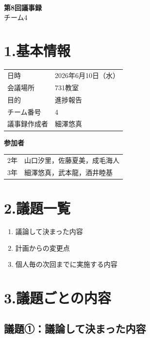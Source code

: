 \documentclass[a4paper,12pt]{ltjsarticle}
\begin{document}
\begin{center}
  {\Large \textbf{第8回議事録}}\\[8pt]
  {\large チーム4}
\end{center}

\vspace{4mm}

\section*{1.基本情報}
\begin{tabular}{ll}
  \toprule
  日時     & 2026年6月10日（水） \\
  会議場所 & 731教室 \\
  目的     & 進捗報告 \\
  チーム番号 & 4 \\
  議事録作成者 & 細澤悠真 \\
  \bottomrule
\end{tabular}

\vspace{4mm}
\noindent\textbf{参加者}

\begin{tabular}{ll}
  2年 & 山口汐里，佐藤夏美，成毛海人 \\
  3年 & 細澤悠真，武本龍，酒井睦基 \\
\end{tabular}

\section*{2.議題一覧}
\begin{enumerate}[label=議題\arabic*：]
  \item 議論して決まった内容
  \item 計画からの変更点
  \item 個人毎の次回までに実施する内容
\end{enumerate}

\section*{3.議題ごとの内容}

\subsection*{議題①：議論して決まった内容}
\end{document}
